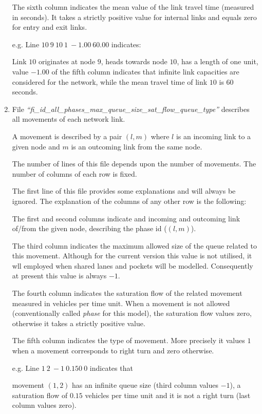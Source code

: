 \documentclass[10pt, conference, compsocconf]{IEEEtran}
\begin{document}
\begin{enumerate}
The sixth column indicates the  mean value of the link travel time (measured in seconds). It takes a strictly positive value for internal links and equals zero for entry and exit links.

e.g. Line $10	\ 9	\ 10	\ 1 \	  -1.00\	 60.00$ indicates:

Link $10$ originates at node $9$,  heads towards node $10$, has a length of one unit, value $-1.00$ of the fifth column indicates that infinite link capacities are considered for the network, while the mean travel time of link $10$ is $60$ seconds. 

\item  File \emph{``fi\_id\_all\_phases\_max\_queue\_size\_sat\_flow\_queue\_type''} describes all movements of each network link.

A movement is described by a pair $(l,m)$ where $l$ is an incoming  link to a given node and $m$ is an outcoming link from the same node.

The number of lines of this file depends upon the number of movements.
The number of columns of each row is fixed.

The first line of this file  provides some explanations  and will always be ignored.
The explanation of the columns of any other row is the following:

The first and second columns indicate and incoming and outcoming link of/from the given node, describing the phase id ($(l,m)$).

The third column  indicates the maximum allowed size of the queue related to this movement. Although for the current  version this value is not utilised,  it wll employed when shared lanes and pockets will be modelled. 
Consequently at present this value is always $-1$.

The fourth column indicates  the saturation flow of the related movement measured in vehicles per time unit. 
When a movement is not allowed (conventionally called \emph{phase} for this model), the saturation flow values zero, otherwise it takes a strictly positive value.
 
The fifth column indicates the  type of movement. More precisely it values $1$ when a movement corresponds to right turn and zero otherwise.


e.g. Line $1	\  2	\ -1	\ 0.150	\ 0 $ indicates  that

movement $(1,2)$ has an infinite queue size (third column values $-1$), a saturation flow of $0.15$ vehicles per time unit and it is not a right turn (last column values zero).


\end{enumerate}
\end{document}

